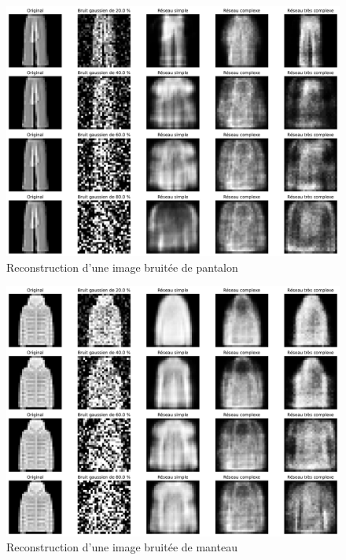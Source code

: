 \documentclass{article}
\begin{document}
\begin{figure}[htbp]
    \centering
    \includegraphics*[width=\textwidth]{reconstruct_noisy_pantalon.pdf}
    \caption{Reconstruction d'une image bruitée de pantalon}
    \label{fig:reconstructnoisypantalon}
\end{figure}


\begin{figure}[htbp]
    \centering
    \includegraphics*[width=\textwidth]{reconstruct_noisy_coat.pdf}
    \caption{Reconstruction d'une image bruitée de manteau}
    \label{fig:reconstructnoisycoat}
\end{figure}
\end{document}
